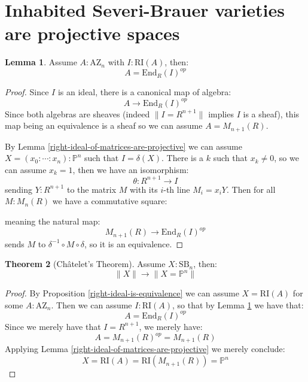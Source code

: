 \documentclass[10pt,a4paper]{article}
\theoremstyle{definition}
\newtheorem{theorem}{Theorem}[section]
\newtheorem{lemma}[theorem]{Lemma}
\newcommand{\SB}{\mathrm{SB}}
\newcommand{\RI}{\mathrm{RI}}
\newcommand{\AZ}{\mathrm{AZ}}
\newcommand{\propTrunc}[1]{\lVert #1 \rVert}
\newcommand{\bP}{\mathbb{P}}
\begin{document}
\section{Inhabited Severi-Brauer varieties are projective spaces}

\begin{lemma}\label{azumaya-with-right-ideal}
Assume $A:\AZ_n$ with $I:\RI(A)$, then:
\[A = \mathrm{End}_R(I)^{op}\]
\end{lemma}

\begin{proof}
Since $I$ is an ideal, there is a canonical map of algebra:
\[A \to\mathrm{End}_R(I)^{op}\]
Since both algebras are sheaves (indeed $\propTrunc{I=R^{n+1}}$ implies $I$ is a sheaf), this map being an equivalence is a sheaf so we can assume $A=M_{n+1}(R)$.

By Lemma \ref{right-ideal-of-matrices-are-projective} we can assume $X=(x_0:\cdots:x_n):\bP^n$ such that $I=\delta(X)$. There is a $k$ such that $x_k\not=0$, so we can assume $x_k=1$, then we have an isomorphism:
\[\theta:R^{n+1}\to I\]
sending $Y:R^{n+1}$ to the matrix $M$ with its $i$-th line $M_i=x_iY$. Then for all $M:M_n(R)$ we have a commutative square:
\begin{center}
\end{center}
meaning the natural map:
\[ M_{n+1}(R)\to \mathrm{End}_R(I)^{op}\]
sends $M$ to $\delta^{-1}\circ M\circ\delta$, so it is an equivalence.
\end{proof}

\begin{theorem}[Ch\^atelet's Theorem]\label{chatelet-theorem}
Assume $X:\SB_n$, then:
\[\propTrunc{X}\to\propTrunc{X=\bP^n}\]
\end{theorem}

\begin{proof}
By Proposition \ref{right-ideal-is-equivalence} we can assume $X=\RI(A)$ for some $A:\AZ_n$. Then we can assume $I:\RI(A)$, so that by Lemma \ref{azumaya-with-right-ideal} we have that:
\[A=\mathrm{End}_R(I)^{op}\]
Since we merely have that $I=R^{n+1}$, we merely have:
\[A = M_{n+1}(R)^{op} = M_{n+1}(R)\]
Applying Lemma \ref{right-ideal-of-matrices-are-projective} we merely conclude:
\[X=\RI(A)=\RI(M_{n+1}(R)) = \bP^n\]
\end{proof}
\end{document}
